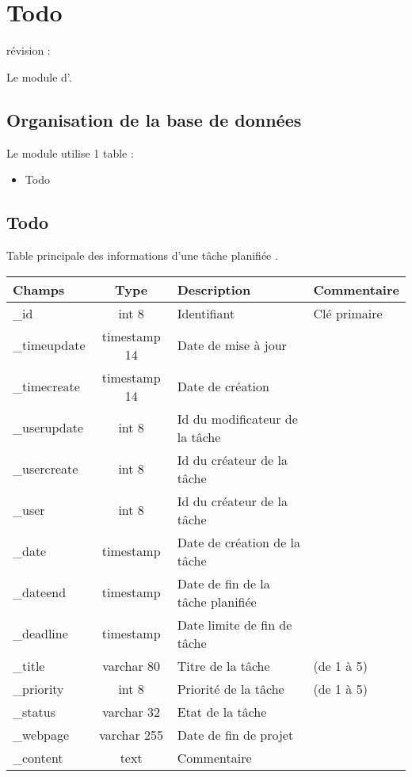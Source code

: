 

\clearpage
\section{Todo}
révision : 

Le module \todo d'\obm.

\subsection{Organisation de la base de données}

Le module \todo utilise 1 table :
\begin{itemize}
 \item Todo
\end{itemize}

\subsection{Todo}
Table principale des informations d'une tâche planifiée .\\

\begin{tabular}{|p{3cm}|c|p{5.4cm}|p{2.6cm}|}
\hline
\textbf{Champs} & \textbf{Type} & \textbf{Description} & \textbf{Commentaire} \\
\hline
\_id & int 8 & Identifiant & Clé primaire \\
\hline
\_timeupdate & timestamp 14 & Date de mise à jour & \\
\hline
\_timecreate & timestamp 14 & Date de création & \\
\hline
\_userupdate & int 8 & Id du modificateur de la tâche & \\
\hline
\_usercreate & int 8 & Id du créateur de la tâche & \\
\hline
\_user & int 8 & Id du créateur de la tâche & \\
\hline
\_date & timestamp & Date de création de la tâche & \\
\hline
\_dateend & timestamp & Date de fin de la tâche planifiée & \\
\hline
\_deadline & timestamp & Date limite de fin de tâche & \\
\hline
\_title & varchar 80 & Titre de la tâche & (de 1 à 5)\\
\hline
\_priority & int 8 & Priorité de la tâche & (de 1 à 5)\\
\hline
\_status & varchar 32 & Etat de la tâche & \\
\hline
\_webpage & varchar 255 & Date de fin de projet & \\
\hline
\_content & text & Commentaire &\\
\hline
\end{tabular}


